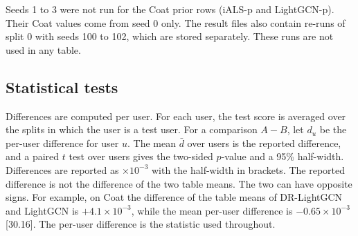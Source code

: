 Seeds 1 to 3 were not run for the Coat prior rows (iALS-p and LightGCN-p). Their Coat values come from
seed 0 only. The result files also contain re-runs of split 0 with seeds 100 to 102, which are stored
separately. These runs are not used in any table.

\subsection{Statistical tests}\label{sec:stats}

Differences are computed per user. For each user, the test score is averaged over the splits in which the
user is a test user. For a comparison $A-B$, let $d_u$ be the per-user difference for user $u$. The mean
$\bar d$ over users is the reported difference, and a paired $t$ test over users gives the two-sided $p$-value
and a 95\% half-width. Differences are reported as $\times10^{-3}$ with the half-width in brackets. The
reported difference is not the difference of the two table means. The two can have opposite signs. For
example, on Coat the difference of the table means of DR-LightGCN and LightGCN is $+4.1\times10^{-3}$, while
the mean per-user difference is $-0.65\times10^{-3}$ [30.16]. The per-user difference is the statistic used
throughout.

